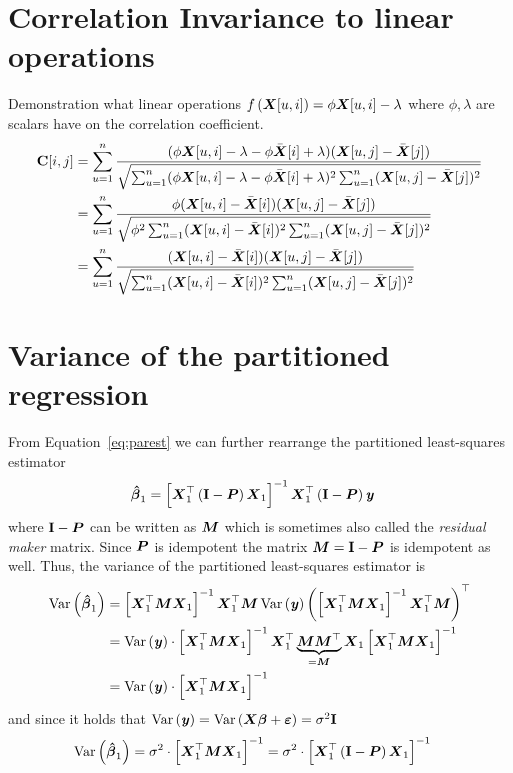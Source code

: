 \documentclass[11pt,a4paper,twoside]{book}\usepackage[]{graphicx}\usepackage[]{xcolor}
\begin{document}
\section{Correlation Invariance to linear operations}\label{sec:coinvar}
Demonstration what linear operations $f\left(\X[u,i]\right)=\phi\X[u,i]-\lambda$ where $\phi,\lambda$ are scalars have on the correlation coefficient.
\begin{align*}
\C[i,j]
&=\sum_{u=1}^{n} \frac{(\phi\X[u,i]-\lambda-\phi\bar{\X}[i]+\lambda)(\X[u,j]-\bar{\X}[j])}{\sqrt{\sum_{u=1}^{n}(\phi\X[u,i]-\lambda-\phi\bar{\X}[i]+\lambda)^2\sum_{u=1}^{n}(\X[u,j]-\bar{\X}[j])^2}}\\
&=\sum_{u=1}^{n} \frac{\phi(\X[u,i]-\bar{\X}[i])(\X[u,j]-\bar{\X}[j])}{\sqrt{\phi^2\sum_{u=1}^{n}(\X[u,i]-\bar{\X}[i])^2\sum_{u=1}^{n}(\X[u,j]-\bar{\X}[j])^2}}\\
&=\sum_{u=1}^{n} \frac{(\X[u,i]-\bar{\X}[i])(\X[u,j]-\bar{\X}[j])}{\sqrt{\sum_{u=1}^{n}(\X[u,i]-\bar{\X}[i])^2\sum_{u=1}^{n}(\X[u,j]-\bar{\X}[j])^2}}\\
\end{align*}

\section{Variance of the partitioned regression}\label{sec:varpar}

From Equation~\eqref{eq:parest} we can further rearrange the partitioned least-squares estimator
\begin{align*}
\hbbeta_1&=\left[\X_1^\top\left(\I-\bP\right)\X_1\right]^{-1} \X_1^\top\left(\I-\bP\right)\y
\end{align*}
where $\I-\bP$ can be written as $\M$ which is sometimes also called the \textit{residual maker} matrix. Since $\bP$ is idempotent the matrix $\M=\I-\bP$ is idempotent as well. Thus, the variance of the partitioned least-squares estimator is
\begin{align*}
\var\left(\hbbeta_1\right)&=\left[\X_1^\top\M\X_1\right]^{-1} \X_1^\top\M\var\left(\y\right)\left(\left[\X_1^\top\M\X_1\right]^{-1} \X_1^\top\M\right)^\top\\
&= \var\left(\y\right)\cdot\left[\X_1^\top\M\X_1\right]^{-1} \X_1^\top\underbrace{\M\M^\top}_{=\M}\X_1\left[\X_1^\top\M\X_1\right]^{-1}\\
&= \var\left(\y\right)\cdot\left[\X_1^\top\M\X_1\right]^{-1}
\end{align*}
and since it holds that $\var\left(\y\right)=\var\left(\X\bbeta+\bvarepsilon\right)=\sigma^2\I$
\begin{align*}
\var\left(\hbbeta_1\right)&=\sigma^2\cdot\left[\X_1^\top\M\X_1\right]^{-1}=\sigma^2\cdot\left[\X_1^\top\left(\I-\bP\right)\X_1\right]^{-1}
\label{eq:varpar}
\end{align*}
\end{document}
